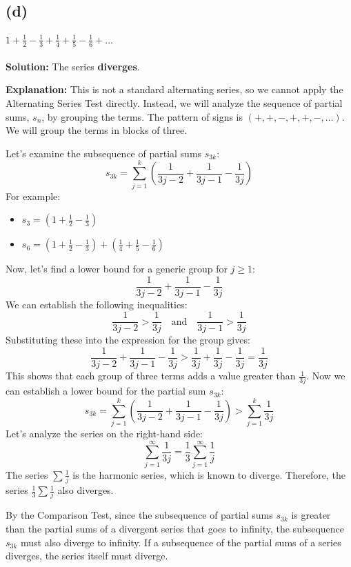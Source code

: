 \documentclass[12pt,a4paper]{article}
\theoremstyle{definition}
\theoremstyle{remark}
\begin{document}

\subsection*{(d)}
\paragraph{$\displaystyle 1 + \frac{1}{2} - \frac{1}{3} + \frac{1}{4} + \frac{1}{5} - \frac{1}{6} + \dots$}
\textbf{Solution:} The series \textbf{diverges}.

\textbf{Explanation:}
This is not a standard alternating series, so we cannot apply the Alternating Series Test directly. Instead, we will analyze the sequence of partial sums, $s_n$, by grouping the terms. The pattern of signs is $(+,+,-,+,+,-, \dots)$. We will group the terms in blocks of three.

Let's examine the subsequence of partial sums $s_{3k}$:
\[ s_{3k} = \sum_{j=1}^{k} \left( \frac{1}{3j-2} + \frac{1}{3j-1} - \frac{1}{3j} \right) \]
For example:
\begin{itemize}
    \item $s_3 = \left(1 + \frac{1}{2} - \frac{1}{3}\right)$
    \item $s_6 = \left(1 + \frac{1}{2} - \frac{1}{3}\right) + \left(\frac{1}{4} + \frac{1}{5} - \frac{1}{6}\right)$
\end{itemize}
Now, let's find a lower bound for a generic group for $j \ge 1$:
\[ \frac{1}{3j-2} + \frac{1}{3j-1} - \frac{1}{3j} \]
We can establish the following inequalities:
\[ \frac{1}{3j-2} > \frac{1}{3j} \quad \text{and} \quad \frac{1}{3j-1} > \frac{1}{3j} \]
Substituting these into the expression for the group gives:
\[ \frac{1}{3j-2} + \frac{1}{3j-1} - \frac{1}{3j} > \frac{1}{3j} + \frac{1}{3j} - \frac{1}{3j} = \frac{1}{3j} \]
This shows that each group of three terms adds a value greater than $\frac{1}{3j}$.
Now we can establish a lower bound for the partial sum $s_{3k}$:
\[ s_{3k} = \sum_{j=1}^{k} \left( \frac{1}{3j-2} + \frac{1}{3j-1} - \frac{1}{3j} \right) > \sum_{j=1}^{k} \frac{1}{3j} \]
Let's analyze the series on the right-hand side:
\[ \sum_{j=1}^{\infty} \frac{1}{3j} = \frac{1}{3} \sum_{j=1}^{\infty} \frac{1}{j} \]
The series $\sum \frac{1}{j}$ is the harmonic series, which is known to diverge. Therefore, the series $\frac{1}{3} \sum \frac{1}{j}$ also diverges.

By the Comparison Test, since the subsequence of partial sums $s_{3k}$ is greater than the partial sums of a divergent series that goes to infinity, the subsequence $s_{3k}$ must also diverge to infinity.
If a subsequence of the partial sums of a series diverges, the series itself must diverge.
\end{document}
